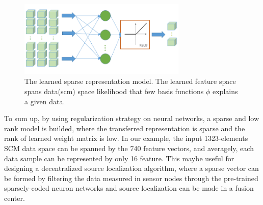 \begin{figure}
\includegraphics[width=8cm]{figure/sparse_represention_model}
\caption{The learned sparse representation model. The learned feature space spans data(scm) space likelihood that few basis functions $\phi$ explains a given data.}
\end{figure}
To sum up, by using regularization strategy on neural networks, a sparse and low rank model is builded, where the transferred representation is sparse and the rank of learned weight matrix is low. In our example, the input 1323-elements SCM data space can be spanned by the 740 feature vectors, and averagely, each data sample can be represented by only 16 feature.
This maybe useful for designing a decentralized source localization algorithm, where a sparse vector can be formed by filtering the data measured in sensor nodes through the pre-trained sparsely-coded neuron networks and source localization can be made in a fusion center.

